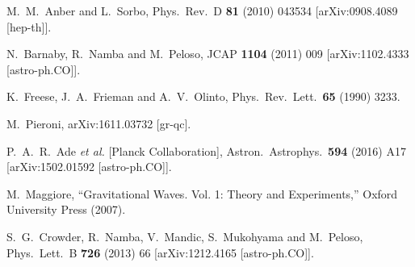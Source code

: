 \begin{thebibliography}{10}
  M.~M.~Anber and L.~Sorbo,
  Phys.\ Rev.\ D {\bf 81} (2010) 043534
  [arXiv:0908.4089 [hep-th]].


  N.~Barnaby, R.~Namba and M.~Peloso,
  JCAP {\bf 1104} (2011) 009
  [arXiv:1102.4333 [astro-ph.CO]].


  K.~Freese, J.~A.~Frieman and A.~V.~Olinto,
  Phys.\ Rev.\ Lett.\  {\bf 65} (1990) 3233.


  M.~Pieroni,
  arXiv:1611.03732 [gr-qc].


  P.~A.~R.~Ade {\it et al.} [Planck Collaboration],
  Astron.\ Astrophys.\  {\bf 594} (2016) A17
  [arXiv:1502.01592 [astro-ph.CO]].


  M.~Maggiore,
  ``Gravitational Waves. Vol. 1: Theory and Experiments,''
  Oxford University Press (2007).


  S.~G.~Crowder, R.~Namba, V.~Mandic, S.~Mukohyama and M.~Peloso,
  Phys.\ Lett.\ B {\bf 726} (2013) 66
  [arXiv:1212.4165 [astro-ph.CO]].



\end{thebibliography}
